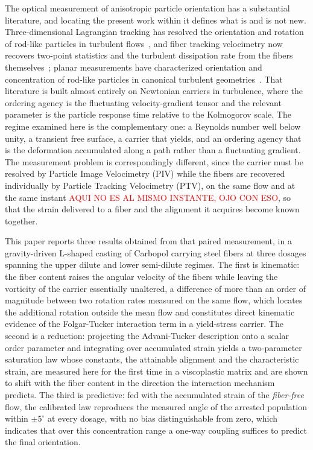 \documentclass[%
  aip,
  pof,          %
  reprint,      %
  floatfix
]{revtex4-2}
\begin{document}
The optical measurement of anisotropic particle orientation has a substantial literature, and locating the present work within it defines what is and is not new. Three-dimensional Lagrangian tracking has resolved the orientation and rotation of rod-like particles in turbulent flows~\cite{parsa2012rotation,voth2017anisotropic}, and fiber tracking velocimetry now recovers two-point statistics and the turbulent dissipation rate from the fibers themselves~\cite{brizzolara2021fiber}; planar measurements have characterized orientation and concentration of rod-like particles in canonical turbulent geometries~\cite{capone2015rod,marchioli2010orientation}. That literature is built almost entirely on Newtonian carriers in turbulence, where the ordering agency is the fluctuating velocity-gradient tensor and the relevant parameter is the particle response time relative to the Kolmogorov scale. The regime examined here is the complementary one: a Reynolds number well below unity, a transient free surface, a carrier that yields, and an ordering agency that is the deformation accumulated along a path rather than a fluctuating gradient. The measurement problem is correspondingly different, since the carrier must be resolved by Particle Image Velocimetry (PIV) while the fibers are recovered individually by Particle Tracking Velocimetry (PTV), on the same flow and at the same instant \textcolor{red}{AQUI NO ES AL MISMO INSTANTE, OJO CON ESO}, so that the strain delivered to a fiber and the alignment it acquires become known together.

This paper reports three results obtained from that paired measurement, in a gravity-driven L-shaped casting of Carbopol carrying steel fibers at three dosages spanning the upper dilute and lower semi-dilute regimes. The first is kinematic: the fiber content raises the angular velocity of the fibers while leaving the vorticity of the carrier essentially unaltered, a difference of more than an order of magnitude between two rotation rates measured on the same flow, which locates the additional rotation outside the mean flow and constitutes direct kinematic evidence of the Folgar-Tucker interaction term in a yield-stress carrier. The second is a reduction: projecting the Advani-Tucker description onto a scalar order parameter and integrating over accumulated strain yields a two-parameter saturation law whose constants, the attainable alignment and the characteristic strain, are measured here for the first time in a viscoplastic matrix and are shown to shift with the fiber content in the direction the interaction mechanism predicts. The third is predictive: fed with the accumulated strain of the \emph{fiber-free} flow, the calibrated law reproduces the measured angle of the arrested population within $\pm 5^\circ$ at every dosage, with no bias distinguishable from zero, which indicates that over this concentration range a one-way coupling suffices to predict the final orientation.
\end{document}
